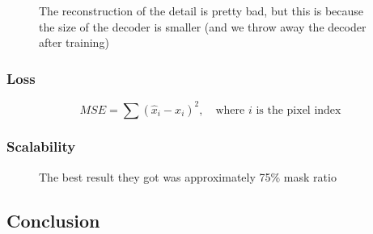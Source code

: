 \documentclass[11pt]{article}
\begin{document}
\begin{figure}[H]
    \centering
    \caption*{The reconstruction of the detail is pretty bad, but this is because the size of the decoder is smaller (and we throw away the decoder after training)}
\end{figure}

\subsubsection{Loss}

\begin{equation}
    MSE = \sum(\hat x_i - x_i)^2,\quad \text{where $i$ is the pixel index}
\end{equation}

\subsubsection{Scalability}

\begin{figure}[H]
    \centering
    \caption*{The best result they got was approximately 75\% mask ratio}
\end{figure}

\subsection{Conclusion}
\end{document}
